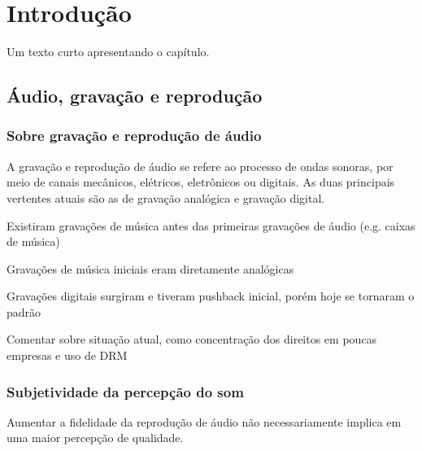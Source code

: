 
\chapter{Introdução}\label{cap:introducao}

Um texto curto apresentando o capítulo.

\section{Áudio, gravação e reprodução}\label{sec:audioGravacaoReproducao}
\subsection{Sobre gravação e reprodução de áudio}\label{subsec:gravacaoReproducaoAudio}

A gravação e reprodução de áudio se refere ao processo de ondas sonoras, por meio de canais mecânicos, elétricos, eletrônicos ou digitais. As duas principais vertentes atuais são as de gravação analógica e gravação digital. 

\color{orange}
Existiram gravações de música antes das primeiras gravações de áudio (e.g. caixas de música)

Gravações de música iniciais eram diretamente analógicas

Gravações digitais surgiram e tiveram pushback inicial, porém hoje se tornaram o padrão

Comentar sobre situação atual, como concentração dos direitos em poucas empresas e uso de DRM

\color{black}


\subsection{Subjetividade da percepção do som}\label{subsec:subjetividadeSom}

Aumentar a fidelidade da reprodução de áudio não necessariamente implica em uma maior percepção de qualidade. 

